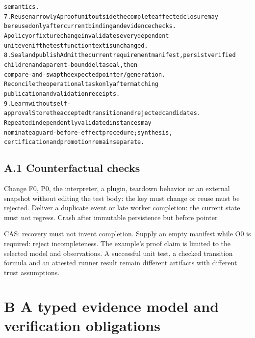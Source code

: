 \begin{alltt}
                                            semantics.
7. Reuse narrowly                           A proof unit outside the complete affected closure may
                                            be reused only after current binding and evidence checks.
                                            A policy or fixture change invalidates every dependent
                                            unit even if the test function text is unchanged.
8. Seal and publish                         Admit the current requirement manifest, persist verified
                                            children and a parent-bound delta seal, then
                                            compare-and-swap the expected pointer/generation.
                                            Reconcile the operational task only after matching
                                            publication and validation receipts.
9. Learn without self-approval              Store the accepted transition and rejected candidates.
                                            Repeated independently validated instances may
                                            nominate a guard-before-effect procedure; synthesis,
                                            certification and promotion remain separate.
\end{alltt}\endgroup


\subsection*{A.1 Counterfactual checks}

Change F0, P0, the interpreter, a plugin, teardown behavior or an external snapshot without editing
the test body: the key must change or reuse must be rejected. Deliver a duplicate event or late worker
completion: the current state must not regress. Crash after immutable persistence but before pointer


CAS: recovery must not invent completion. Supply an empty manifest while O0 is required: reject
incompleteness.
The example’s proof claim is limited to the selected model and observations. A successful unit test, a
checked transition formula and an attested runner result remain different artifacts with different trust
assumptions.


\section*{B A typed evidence model and verification obligations}

